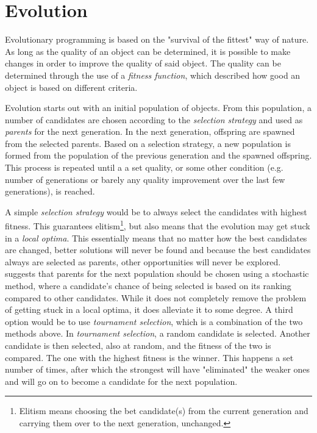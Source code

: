 \section{Evolution}
\label{methodology_evolution}

Evolutionary programming\cite{eiben2008introduction, eiben2002evolutionary} is based on the "survival of the fittest" way of nature. As long as the quality of an object can be determined, it is possible to make changes in order to improve the quality of said object. The quality can be determined through the use of a \textit{fitness function}, which described how good an object is based on different criteria.

Evolution starts out with an initial population of objects. From this population, a number of candidates are chosen according to the \textit{selection strategy} and used as \textit{parents} for the next generation. In the next generation, offspring are spawned from the selected parents. Based on a selection strategy, a new population is formed from the population of the previous generation and the spawned offspring. This process is repeated until a a set quality, or some other condition (e.g. number of generations or barely any quality improvement over the last few generations), is reached.

A simple \textit{selection strategy} would be to always select the candidates with highest fitness. This guarantees elitism\footnote{Elitism means choosing the bet candidate(s) from the current generation and carrying them over to the next generation, unchanged.}, but also means that the evolution may get stuck in a \textit{local optima}. This essentially means that no matter how the best candidates are changed, better solutions will never be found and because the best candidates always are selected as parents, other opportunities will never be explored. \citeauthor{rocha1999preventing}\cite{rocha1999preventing} suggests that parents for the next population should be chosen using a stochastic method, where a candidate's chance of being selected is based on its ranking compared to other candidates. While it does not completely remove the problem of getting stuck in a local optima, it does alleviate it to some degree. A third option would be to use \textit{tournament selection}, which is a combination of the two methods above. In \textit{tournament selection}, a random candidate is selected. Another candidate is then selected, also at random, and the fitness of the two is compared. The one with the highest fitness is the winner. This happens a set number of times, after which the strongest will have "eliminated" the weaker ones and will go on to become a candidate for the next population.

